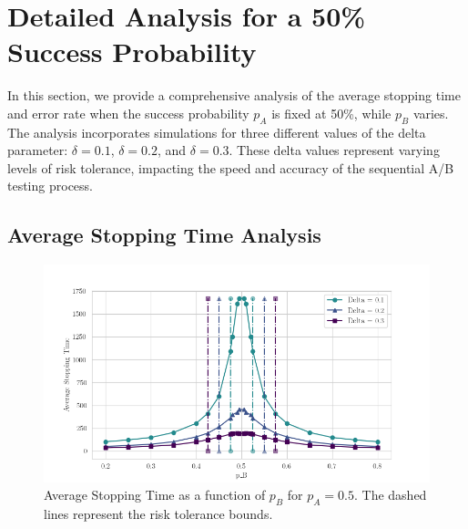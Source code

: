 \documentclass[magisterska, english]{pwr_wmat_praca_dyplomowa}
\theoremstyle{plain}
\numberwithin{theorem}{chapter}
\theoremstyle{definition}
\numberwithin{theorem}{chapter}
\begin{document}
%
%


\section{Detailed Analysis for a 50\% Success Probability}

In this section, we provide a comprehensive analysis of the average stopping time and error rate when the success probability \( p_A \) is fixed at 50\%, while \( p_B \) varies. The analysis incorporates simulations for three different values of the delta parameter: \( \delta = 0.1 \), \( \delta = 0.2 \), and \( \delta = 0.3 \). These delta values represent varying levels of risk tolerance, impacting the speed and accuracy of the sequential A/B testing process.

\subsection{Average Stopping Time Analysis}

\begin{figure}[H]
	\centering
	\includegraphics[width=\textwidth]{images/delta_average_stopping_time.png}
	\caption{Average Stopping Time as a function of \( p_B \) for \( p_A = 0.5 \). The dashed lines represent the risk tolerance bounds.}
	\label{fig:avg_stopping_time_pa05}
\end{figure}
\end{document}
